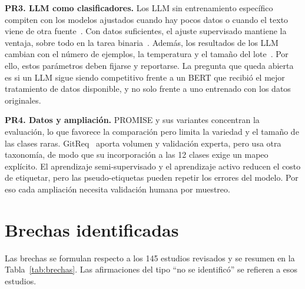 \documentclass[conference]{IEEEtran}
\begin{document}
\textbf{PR3. LLM como clasificadores.} Los LLM sin entrenamiento específico compiten con los modelos ajustados cuando hay pocos datos o cuando el texto viene de otra fuente~\cite{Wang2026-Machine,Kamal2025-Robust}. Con datos suficientes, el ajuste supervisado mantiene la ventaja, sobre todo en la tarea binaria~\cite{Shafikuzzaman2025-Effectiveness,Zhu2026-Prompt}. Además, los resultados de los LLM cambian con el número de ejemplos, la temperatura y el tamaño del lote~\cite{Tang2025-FewShot,Karlsson2025-Reliable,Can2025-OneSize}. Por ello, estos parámetros deben fijarse y reportarse. La pregunta que queda abierta es si un LLM sigue siendo competitivo frente a un BERT que recibió el mejor tratamiento de datos disponible, y no solo frente a uno entrenado con los datos originales.

\textbf{PR4. Datos y ampliación.} PROMISE y sus variantes concentran la evaluación, lo que favorece la comparación pero limita la variedad y el tamaño de las clases raras. GitReq~\cite{Kamal2026-GitReq} aporta volumen y validación experta, pero usa otra taxonomía, de modo que su incorporación a las 12 clases exige un mapeo explícito. El aprendizaje semi-supervisado y el aprendizaje activo reducen el costo de etiquetar, pero las pseudo-etiquetas pueden repetir los errores del modelo. Por eso cada ampliación necesita validación humana por muestreo.


\section{Brechas identificadas}\label{sec:brechas}
Las brechas se formulan respecto a los 145 estudios revisados y se resumen en la Tabla~\ref{tab:brechas}. Las afirmaciones del tipo ``no se identificó'' se refieren a esos estudios.

\end{document}
